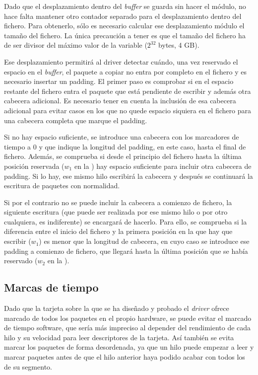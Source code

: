 \documentclass[twoside, 12pt, draft]{epstfg}
\begin{document}
Dado que el desplazamiento dentro del \textit{buffer} se guarda sin hacer el módulo, no hace falta mantener otro contador separado para el desplazamiento dentro del fichero. Para obtenerlo, sólo es necesario calcular ese desplazamiento módulo el tamaño del fichero. La única precaución a tener es que el tamaño del fichero ha de ser divisor del máximo valor de la variable ($2^{32}$ bytes, 4 GB).

Ese desplazamiento permitirá al \gls{driver} detectar cuándo, una vez reservado el espacio en el \textit{buffer}, el paquete a copiar no entra por completo en el fichero y es necesario insertar un \gls{padding}. El primer paso es comprobar si en el espacio restante del fichero entra el paquete que está pendiente de escribir y además otra cabecera adicional. Es necesario tener en cuenta la inclusión de esa cabecera adicional para evitar casos en los que no quede espacio siquiera en el fichero para una cabecera completa que marque el \gls{padding}.

Si no hay espacio suficiente, se introduce una cabecera con los marcadores de tiempo a 0 y que indique la longitud del \gls{padding}, en este caso, hasta el final de fichero. Además, se comprueba si desde el principio del fichero hasta la última posición reservada ($w_1$ en la ) hay espacio suficiente para incluir otra cabecera de \gls{padding}. Si lo hay, ese mismo hilo escribirá la cabecera y después se continuará la escritura de paquetes con normalidad.

Si por el contrario no se puede incluir la cabecera a comienzo de fichero, la siguiente escritura (que puede ser realizada por ese mismo hilo o por otro cualquiera, es indiferente) se encargará de hacerlo. Para ello, se comprueba si la diferencia entre el inicio del fichero y la primera posición en la que hay que escribir ($w_1$) es menor que la longitud de cabecera, en cuyo caso se introduce ese \gls{padding} a comienzo de fichero, que llegará hasta la última posición que se había reservado ($w_2$ en la ).

\subsection{Marcas de tiempo}

Dado que la tarjeta sobre la que se ha diseñado y probado el \textit{driver} ofrece marcado de todos los paquetes en el propio hardware, se puede evitar el marcado de tiempo software, que sería más impreciso al depender del rendimiento de cada hilo y su velocidad para leer descriptores de la tarjeta. Así también se evita marcar los paquetes de forma desordenada, ya que un hilo puede empezar a leer y marcar paquetes antes de que el hilo anterior haya podido acabar con todos los de su segmento.
\end{document}

